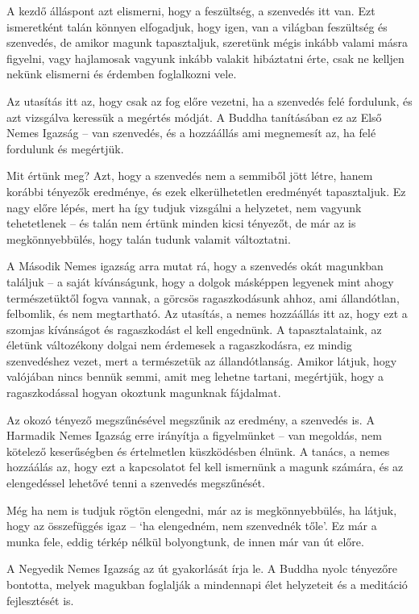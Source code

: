 A kezdő álláspont azt elismerni, hogy a feszültség, a szenvedés itt van.
Ezt ismeretként talán könnyen elfogadjuk, hogy igen, van a világban
feszültség és szenvedés, de amikor magunk tapasztaljuk, szeretünk mégis
inkább valami másra figyelni, vagy hajlamosak vagyunk inkább valakit
hibáztatni érte, csak ne kelljen nekünk elismerni és érdemben
foglalkozni vele.

Az utasítás itt az, hogy csak az fog előre vezetni, ha a szenvedés felé
fordulunk, és azt vizsgálva keressük a megértés módját. A Buddha
tanításában ez az Első Nemes Igazság -- van szenvedés, és a hozzáállás
ami megnemesít az, ha felé fordulunk és megértjük.

Mit értünk meg? Azt, hogy a szenvedés nem a semmiből jött létre, hanem
korábbi tényezők eredménye, és ezek elkerülhetetlen eredményét
tapasztaljuk. Ez nagy előre lépés, mert ha így tudjuk vizsgálni a
helyzetet, nem vagyunk tehetetlenek -- és talán nem értünk minden kicsi
tényezőt, de már az is megkönnyebbülés, hogy talán tudunk valamit
változtatni.

A Második Nemes igazság arra mutat rá, hogy a szenvedés okát magunkban
találjuk -- a saját kívánságunk, hogy a dolgok másképpen legyenek mint
ahogy természetüktől fogva vannak, a görcsös ragaszkodásunk ahhoz, ami
állandótlan, felbomlik, és nem megtartható. Az utasítás, a nemes
hozzáállás itt az, hogy ezt a szomjas kívánságot és ragaszkodást el kell
engednünk. A tapasztalataink, az életünk változékony dolgai nem
érdemesek a ragaszkodásra, ez mindig szenvedéshez vezet, mert a
természetük az állandótlanság. Amikor látjuk, hogy valójában nincs
bennük semmi, amit meg lehetne tartani, megértjük, hogy a ragaszkodással
hogyan okoztunk magunknak fájdalmat.

Az okozó tényező megszűnésével megszűnik az eredmény, a szenvedés is. A
Harmadik Nemes Igazság erre irányítja a figyelmünket -- van megoldás,
nem kötelező keserűségben és értelmetlen küszködésben élnünk. A tanács,
a nemes hozzáálás az, hogy ezt a kapcsolatot fel kell ismernünk a magunk
számára, és az elengedéssel lehetővé tenni a szenvedés megszűnését.

Még ha nem is tudjuk rögtön elengedni, már az is megkönnyebbülés, ha
látjuk, hogy az összefüggés igaz -- `ha elengedném, nem szenvednék
tőle'. Ez már a munka fele, eddig térkép nélkül bolyongtunk, de innen
már van út előre.

A Negyedik Nemes Igazság az út gyakorlását írja le. A Buddha nyolc
tényezőre bontotta, melyek magukban foglalják a mindennapi élet
helyzeteit és a meditáció fejlesztését is.

